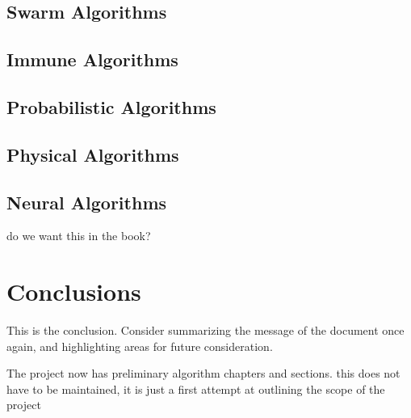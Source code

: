 \documentclass[a4paper, 11pt]{article}
\begin{document}
\subsection{Swarm Algorithms}

\subsection{Immune Algorithms}

\subsection{Probabilistic Algorithms}

\subsection{Physical Algorithms}

\subsection{Neural Algorithms}
do we want this in the book?

\section{Conclusions}
\label{sec:conclusions}
This is the conclusion. Consider summarizing the message of the document once again, and highlighting areas for future consideration.

The project now has preliminary algorithm chapters and sections.
this does not have to be maintained, it is just a first attempt at outlining the scope of the project




\end{document}
